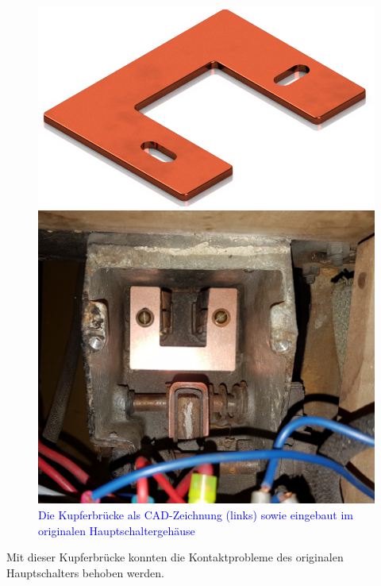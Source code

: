 \begin{figure}[h!]
\begin{minipage}{0.49\textwidth}
\includegraphics[width=\textwidth]{images/Bruecke_HS.png}
\end{minipage}\begin{minipage}{0.49\textwidth}
\includegraphics[width=\textwidth]{images/U-Profil.png}
\end{minipage}
\caption{\textcolor{blue}{Die Kupferbrücke als CAD-Zeichnung (links) sowie eingebaut im originalen Hauptschaltergehäuse}}%
\label{fig:Bruecke_HS}%
\end{figure}

Mit dieser Kupferbrücke konnten die Kontaktprobleme des originalen Hauptschalters behoben werden.


